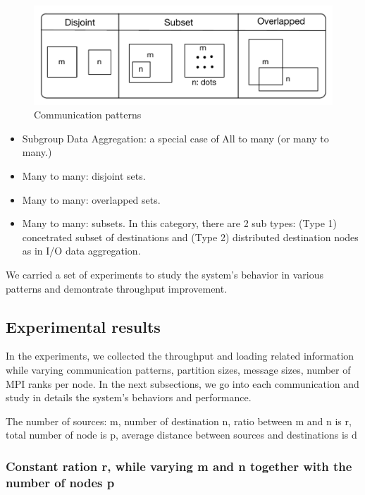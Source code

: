 \begin{figure}[!htb]
\vspace{-0.1in}
\centering
\includegraphics[scale=0.55]{figures/patterns.pdf}
\vspace{-0.1in}
\caption{Communication patterns}
\vspace{-0.1in}
\label{fig:patterns}
\end{figure}

\begin{itemize}
\item Subgroup Data Aggregation: a special case of All to many (or many to many.)
\item Many to many: disjoint sets.
\item Many to many: overlapped sets.
\item Many to many: subsets. In this category, there are 2 sub types: (Type 1) concetrated subset of destinations and (Type 2) distributed destination nodes as in I/O data aggregation.
\end{itemize}

We carried a set of experiments to study the system's behavior in various patterns and demontrate throughput improvement.

\subsection{Experimental results}

In the experiments, we collected the throughput and loading related information while varying communication patterns, partition sizes, message sizes, number of MPI ranks per node.
In the next subsections, we go into each communication and study in details the system's behaviors and performance.

The number of sources: m, number of destination n, ratio between m and n is r, total number of node is p, average distance between sources and destinations is d

\subsubsection{Constant ration r, while varying m and n together with the number of nodes p}

